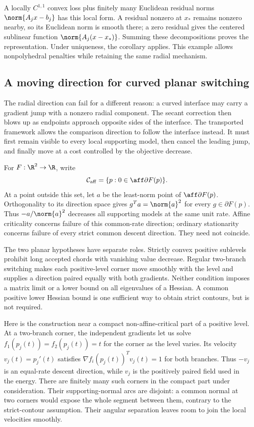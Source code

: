 A locally $C^{1,1}$ convex loss plus finitely many Euclidean
residual norms $\norm{A_jx-b_j}$ has this local form. A residual nonzero at
$x_*$ remains nonzero nearby, so its Euclidean norm is smooth there; a zero
residual gives the centered sublinear function $\norm{A_j(x-x_*)}$.
Summing these decompositions proves the representation. Under uniqueness,
the corollary applies. This example allows nonpolyhedral penalties while
retaining the same radial mechanism.

\subsection{A moving direction for curved planar switching}

The radial direction can fail for a different reason: a curved interface may
carry a gradient jump with a nonzero radial component. The secant correction
then blows up as endpoints approach opposite sides of the interface.
The transported framework allows the comparison direction to follow the
interface instead. It must first remain visible to every local supporting
model, then cancel the leading jump, and finally move at a cost controlled
by the objective decrease.

For $F:\R^2\to\R$, write
\[
 \mathcal C_{\rm aff}=
 \{p:0\in\aff\partial F(p)\}.
\]
At a point outside this set, let $a$ be the least-norm point of
$\aff\partial F(p)$. Orthogonality to its direction space gives
$g^Ta=\norm{a}^2$ for every $g\in\partial F(p)$. Thus
$-a/\norm{a}^2$ decreases all supporting models at the same unit rate.
Affine criticality concerns failure of this common-rate direction;
ordinary stationarity concerns failure of every strict common descent
direction. They need not coincide.

The two planar hypotheses have separate roles. Strictly convex positive
sublevels prohibit long accepted chords with vanishing value decrease.
Regular two-branch switching makes each positive-level corner move smoothly
with the level and supplies a direction paired equally with both gradients.
Neither condition imposes a matrix limit or a lower bound on all eigenvalues
of a Hessian. A common positive lower Hessian bound is one sufficient way
to obtain strict contours, but is not required.

Here is the construction near a compact non-affine-critical part of a positive
level. At a two-branch corner, the independent gradients let us solve
$f_1(p_j(t))=f_2(p_j(t))=t$ for the corner as the level varies.
Its velocity $v_j(t)=p_j'(t)$ satisfies
$\nabla f_i(p_j(t))^Tv_j(t)=1$ for both branches. Thus $-v_j$ is an
equal-rate descent direction, while $v_j$ is the positively paired field
used in the energy. There are finitely many such corners in the compact
part under consideration. Their supporting-normal arcs are disjoint: a common normal at two
corners would expose the whole segment between them, contrary to the
strict-contour assumption. Their angular separation leaves room to join
the local velocities smoothly.

